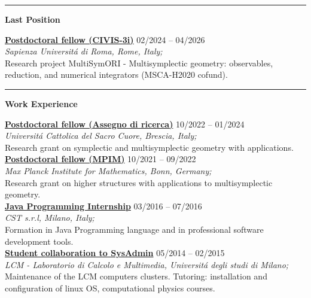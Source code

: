 \documentclass[a4paper]{article}
\newcommand{\block}[1]{\hrule \vspace{0.2cm} \textbf{\Large #1} \vspace{0.2cm}}
\newcommand{\voice}[5]{\href{#4}{\textbf{#1}} \hfill #2 \\ \textit{#3} \\ {\small #5} \vspace{0.2cm} \\}
\begin{document}
\begin{minipage}[t]{0.6\columnwidth}


    \block{Last Position}

    
    \voice{Postdoctoral fellow (CIVIS-3i)}
        {02/2024 -- 04/2026}
        {Sapienza Universit\'a di Roma, Rome, Italy;}
        {https://civis3i.univ-amu.fr/en/civis3i-alliance-programme}       
        {Research project MultiSymORI - Multisymplectic geometry: observables, reduction, and numerical integrators (MSCA-H2020 cofund).\vspace{-0.25cm}}





    \block{Work Experience}

    
    \voice{Postdoctoral fellow (Assegno di ricerca)}
        {10/2022 -- 01/2024}
        {Universit\'a Cattolica del Sacro Cuore, Brescia, Italy;}
        {https://dipartimenti.unicatt.it/dmf-home}       
        {Research grant on symplectic and multisymplectic geometry with applications.}
    \voice{Postdoctoral fellow (MPIM)}
        {10/2021 -- 09/2022}
        {Max Planck Institute for Mathematics, Bonn, Germany;}
        {https://www.mpim-bonn.mpg.de/}       
        {Research grant on higher structures with applications to multisymplectic geometry.}
    \voice{Java Programming Internship}
        {03/2016 -- 07/2016}
        {CST s.r.l, Milano, Italy;}
        {https://www.csttech.it/}       
        {Formation in Java Programming language and in professional software development tools.}
    \voice{Student collaboration to SysAdmin}
        {05/2014 -- 02/2015}
        {LCM - Laboratorio di Calcolo e Multimedia, Universit\'a degli studi di Milano;}
        {https://lcm.mi.infn.it/}       
        {Maintenance of the LCM computers clusters. Tutoring: installation and configuration of linux OS, computational physics courses.\vspace{-0.25cm}}




\end{minipage}
\end{document}
